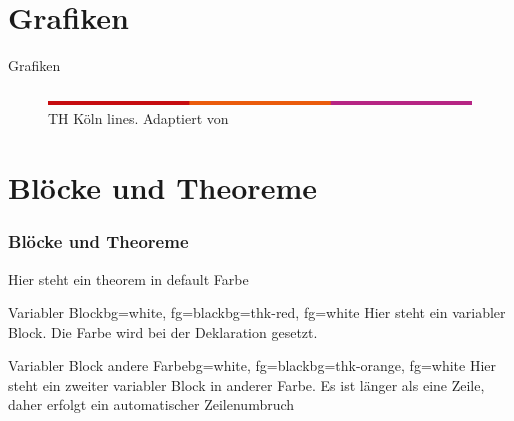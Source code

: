 \documentclass{beamer}
\begin{document}
\section{Grafiken}\label{sec:graphics}
\begin{frame}{Grafiken}
    \begin{figure}\label{thk-linien}
        \includegraphics[width=\textwidth]{figures/thk-lines.png}
        \caption[TH Köln lines]{TH Köln lines. Adaptiert von \cite{source}}
    \end{figure}
\end{frame}

\section{Blöcke und Theoreme}\label{sec:block}
\begin{frame} 
    \frametitle{Blöcke und Theoreme} 
    \begin{theorem}
        Hier steht ein theorem in default Farbe
    \end{theorem}
	
	\begin{variableblock}{Variabler Block}{bg=white, fg=black}{bg=thk-red, fg=white}
		Hier steht ein variabler Block. Die Farbe wird bei der Deklaration gesetzt.
	\end{variableblock}

    \begin{variableblock}{Variabler Block andere Farbe}{bg=white, fg=black}{bg=thk-orange, fg=white}
        Hier steht ein zweiter variabler Block in anderer Farbe. Es ist länger als eine Zeile, daher erfolgt ein automatischer Zeilenumbruch
    \end{variableblock}
\end{frame}
\end{document}
